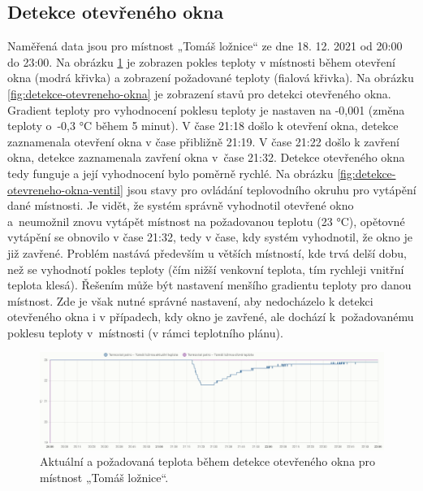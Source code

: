 \subsection{Detekce otevřeného okna}
Naměřená data jsou pro místnost „Tomáš ložnice“ ze dne 18. 12. 2021 od 20:00 do 23:00. Na obrázku \ref{fig:detekce-otevreneho-okna-aktualni-pozadovana-teplota} je zobrazen pokles teploty v místnosti během otevření okna (modrá křivka) a zobrazení požadované teploty (fialová křivka). Na obrázku \ref{fig:detekce-otevreneho-okna} je zobrazení stavů pro detekci otevřeného okna. Gradient teploty pro vyhodnocení poklesu teploty je nastaven na -0,001 (změna teploty o~-0,3 °C během 5 minut). V čase 21:18 došlo k otevření okna, detekce zaznamenala otevření okna v čase přibližně 21:19. V čase 21:22 došlo k zavření okna, detekce zaznamenala zavření okna v~čase 21:32. Detekce otevřeného okna tedy funguje a její vyhodnocení bylo poměrně rychlé. Na obrázku \ref{fig:detekce-otevreneho-okna-ventil} jsou stavy pro ovládání teplovodního okruhu pro vytápění dané místnosti. Je vidět, že systém správně vyhodnotil otevřené okno a~neumožnil znovu vytápět místnost na požadovanou teplotu (23 °C), opětovné vytápění se obnovilo v čase 21:32, tedy v čase, kdy systém vyhodnotil, že okno je již zavřené. Problém nastává především u větších místností, kde trvá delší dobu, než se vyhodnotí pokles teploty (čím nižší venkovní teplota, tím rychleji vnitřní teplota klesá). Řešením může být nastavení menšího gradientu teploty pro danou místnost. Zde je však nutné správné nastavení, aby nedocházelo k detekci otevřeného okna i v případech, kdy okno je zavřené, ale dochází k~požadovanému poklesu teploty v~místnosti (v rámci teplotního plánu).

\begin{figure}[H]
    \centering
    \includegraphics[width=\textwidth]{images/testovani/detekce-otevreneho-okna/detekce-otevreneho-okna-aktualni-pozadovana-teplota.png}
    \caption{Aktuální a požadovaná teplota během detekce otevřeného okna pro místnost „Tomáš ložnice“.}
    \label{fig:detekce-otevreneho-okna-aktualni-pozadovana-teplota}
\end{figure}

